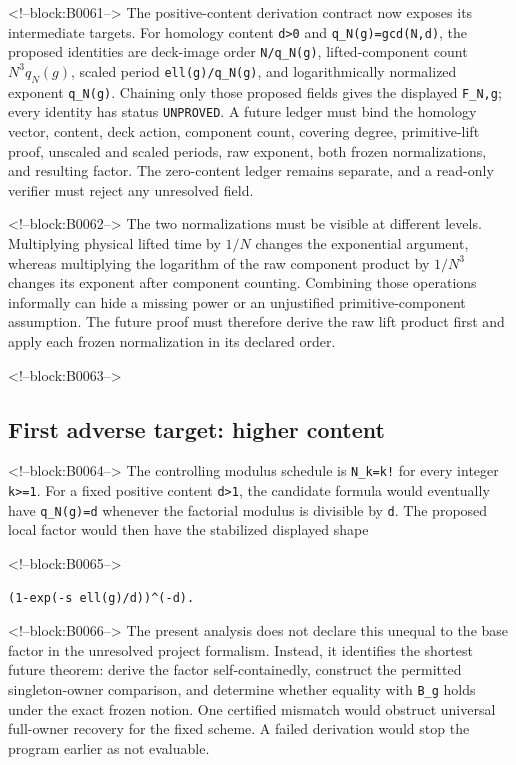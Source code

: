 \documentclass[11pt]{article}
\begin{document}
<!--block:B0061-->
The positive-content derivation contract now exposes its intermediate
targets. For homology content \texttt{d>0} and
\texttt{q\_N(g)=gcd(N,d)}, the proposed identities are deck-image order
\texttt{N/q\_N(g)}, lifted-component count
\(N^3 q_N(g)\), scaled period \texttt{ell(g)/q\_N(g)}, and logarithmically
normalized exponent \texttt{q\_N(g)}. Chaining only those proposed fields
gives the displayed \texttt{F\_N,g}; every identity has status
\texttt{UNPROVED}. A future ledger must bind the homology vector, content, deck
action, component count, covering degree, primitive-lift proof, unscaled and
scaled periods, raw exponent, both frozen normalizations, and resulting factor.
The zero-content ledger remains separate, and a read-only verifier must reject
any unresolved field.

<!--block:B0062-->
The two normalizations must be visible at different levels. Multiplying
physical lifted time by $1/N$ changes the exponential argument, whereas
multiplying the logarithm of the raw component product by $1/N^3$
changes its exponent after component counting. Combining those
operations informally can hide a missing power or an unjustified
primitive-component assumption. The future proof must therefore derive
the raw lift product first and apply each frozen normalization in its
declared order.

<!--block:B0063-->
\hypertarget{42-first-adverse-target-higher-content}{%
\subsection{First adverse target: higher
content}\label{42-first-adverse-target-higher-content}}

<!--block:B0064-->
The controlling modulus schedule is \texttt{N\_k=k!} for every integer
\texttt{k\textgreater{}=1}. For a fixed positive content
\texttt{d\textgreater{}1}, the candidate formula would eventually have
\texttt{q\_N(g)=d} whenever the factorial modulus is divisible by
\texttt{d}. The proposed local factor would then have the stabilized
displayed shape

<!--block:B0065-->
\begin{verbatim}
(1-exp(-s ell(g)/d))^(-d).
\end{verbatim}

<!--block:B0066-->
The present analysis does not declare this unequal to the base factor in the
unresolved project formalism. Instead, it identifies the shortest future
theorem: derive the factor self-containedly, construct the permitted
singleton-owner comparison, and determine whether equality with
\texttt{B\_g} holds under the exact frozen notion. One certified
mismatch would obstruct universal full-owner recovery for the fixed
scheme. A failed derivation would stop the program earlier as not
evaluable.
\end{document}
